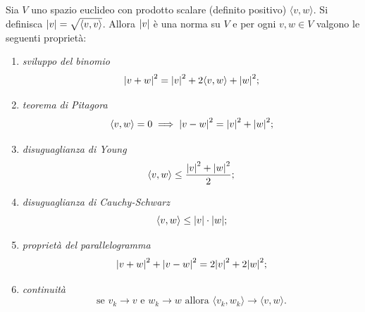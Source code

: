 \begin{theorem}
\label{th:spazio_euclideo}%
Sia $V$ uno spazio euclideo con prodotto scalare (definito positivo) $\langle v, w\rangle$.
Si definisca ${\left|v\right|} = \sqrt{\langle v,v\rangle}$.
Allora ${\left|v\right|}$ è una norma su $V$
e per ogni $v,w\in V$ valgono le seguenti proprietà:
\begin{enumerate}
\item \emph{sviluppo del binomio}%
%
\begin{equation}\label{eq:binomio_vettoriale}%
  \abs{v+w}^2 = \abs{v}^2 + 2 \langle v,w\rangle + \abs{w}^2;
\end{equation}
\item \emph{teorema di Pitagora}%
%
%
\begin{equation}\label{eq:Pitagora}
  \langle v,w\rangle=0 \implies {\left|v-w\right|}^2 = {\left|v\right|}^2 + {\left|w\right|}^2;
\end{equation}
\item \emph{disuguaglianza di Young}%
%
%
\begin{equation}\label{eq:Young}
  \langle v,w\rangle \le \frac{{\left|v\right|}^2 + {\left|w\right|}^2}{2};
\end{equation}
\item \emph{disuguaglianza di Cauchy-Schwarz}%
%
%
%
\begin{equation}\label{eq:Cauchy_Schwarz}
   \langle v,w \rangle \le {\left|v\right|} \cdot {\left|w\right|};
\end{equation}
\item \emph{proprietà del parallelogramma}%
%
\begin{equation}\label{eq:parallelogramma}
  {\left|v+w\right|}^2 + {\left|v-w\right|}^2 = 2 {\left|v\right|}^2 + 2{\left|w\right|}^2;
\end{equation}
\item \emph{continuità}
\[
  \text{se $v_k\to v$ e $w_k\to w$ allora
  $\langle v_k,w_k\rangle \to \langle v,w \rangle$}.
\]
\end{enumerate}
\end{theorem}
%
